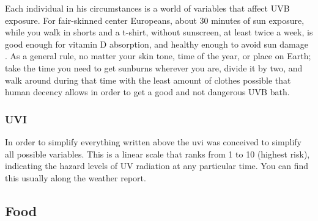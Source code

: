 Each individual in his circumstances is a world of variables that affect UVB exposure. For fair-skinned center Europeans, about 30 minutes of sun exposure, while you walk in shorts and a t-shirt, without sunscreen, at least twice a week, is good enough for vitamin D absorption, and healthy enough to avoid sun damage \cite{ref:Holick2007}. As a general rule, no matter your skin tone, time of the year, or place on Earth; take the time you need to get sunburns wherever you are, divide it by two, and walk around during that time with the least amount of clothes possible that human decency allows in order to get a good and not dangerous UVB bath.\vspace{3 mm}

\subsubsection{UVI}

In order to simplify everything written above the \gls{uvi} was conceived to simplify all possible variables. This is a linear scale that ranks from 1 to 10 (highest risk), indicating the hazard levels of UV radiation at any particular time. You can find this usually along the weather report.\vspace{3 mm}

\subsection{Food}

